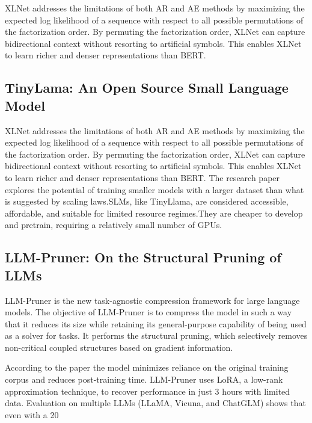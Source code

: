 XLNet addresses the limitations of both AR and AE methods by maximizing the expected log likelihood of a sequence with respect to all possible permutations of the factorization order. By permuting the factorization order, XLNet can capture bidirectional context without resorting to artificial symbols. This enables XLNet to learn richer and denser representations than BERT.

\subsection{TinyLama: An Open Source Small Language Model}

XLNet addresses the limitations of both AR and AE methods by maximizing the expected log likelihood of a sequence with respect to all possible permutations of the factorization order. By permuting the factorization order, XLNet can capture bidirectional context without resorting to artificial symbols. This enables XLNet to learn richer and denser representations than BERT.\cite{TinyLlama:1} The research paper explores the potential of training smaller models with a larger dataset than what is suggested by scaling laws.SLMs, like TinyLlama, are considered accessible, affordable, and suitable for limited resource regimes.They are cheaper to develop and pretrain, requiring a relatively small number of GPUs.

\subsection{LLM-Pruner: On the Structural Pruning of LLMs}

LLM-Pruner is the new task-agnostic compression framework for large language models. The objective of LLM-Pruner is to compress the model in such a way that it reduces its size while retaining its general-purpose capability of being used as a solver for tasks. It performs the structural pruning, which selectively removes non-critical coupled structures based on gradient information.

According to the paper\cite{LlmPruner:1} the model minimizes reliance on the original training corpus and reduces post-training time. LLM-Pruner uses LoRA, a low-rank approximation technique, to recover performance in just 3 hours with limited data. Evaluation on multiple LLMs (LLaMA, Vicuna, and ChatGLM) shows that even with a 20%